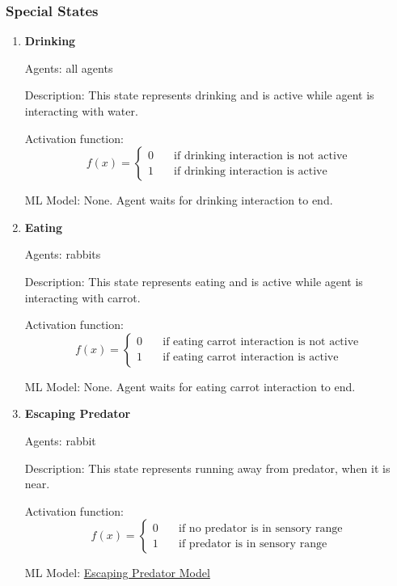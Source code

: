 \subsubsection{Special States}
\begin{enumerate}
    \item \textbf{Drinking}
    
    Agents: all agents
    
    Description: This state represents drinking and is active while agent is interacting with water.
    
    Activation function:
    \begin{equation}
        f(x)= \begin{cases} 
            0 \quad & \text{if drinking interaction is not active} \\
            1 \quad & \text{if drinking interaction is active}
          \end{cases}
    \end{equation}

    ML Model: None. Agent waits for drinking interaction to end.
    
    \item \textbf{Eating}
    
    Agents: rabbits
    
    Description: This state represents eating and is active while agent is interacting with carrot.
    
    Activation function:
    \begin{equation}
        f(x)= \begin{cases} 
            0 \quad & \text{if eating carrot interaction is not active} \\
            1 \quad & \text{if eating carrot interaction is active}
          \end{cases}
    \end{equation}

    ML Model: None. Agent waits for eating carrot interaction to end.
    
    \item \textbf{Escaping Predator}
    
    Agents: rabbit
    
    Description: This state represents running away from predator, when it is near.
    
    Activation function:
    \begin{equation}
        f(x)= \begin{cases} 
            0 \quad & \text{if no predator is in sensory range} \\
            1 \quad & \text{if predator is in sensory range}
          \end{cases}
    \end{equation}
    
    ML Model: \hyperref[escapingPredatorModel]{Escaping Predator Model}
    
\end{enumerate}

